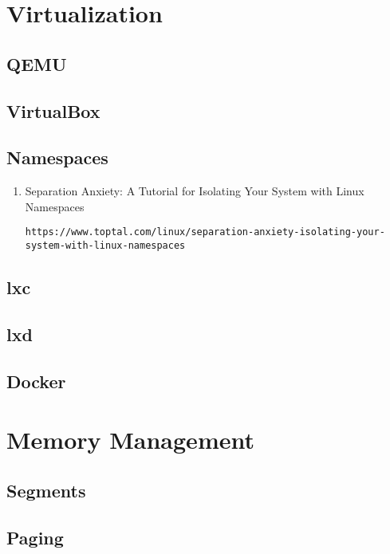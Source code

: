 \documentclass[12pt,a4paper]{article}
\begin{document}
\section{Virtualization}

\subsection{QEMU}

\subsection{VirtualBox}

\subsection{Namespaces}

\begin{enumerate}

\item Separation Anxiety: A Tutorial for Isolating Your System with Linux Namespaces

	\texttt{https://www.toptal.com/linux/separation-anxiety-isolating-your-system-with-linux-namespaces}

\end{enumerate}

\subsection{lxc}

\subsection{lxd}

\subsection{Docker}

\section{Memory Management}

\subsection{Segments}

\subsection{Paging}
\end{document}
